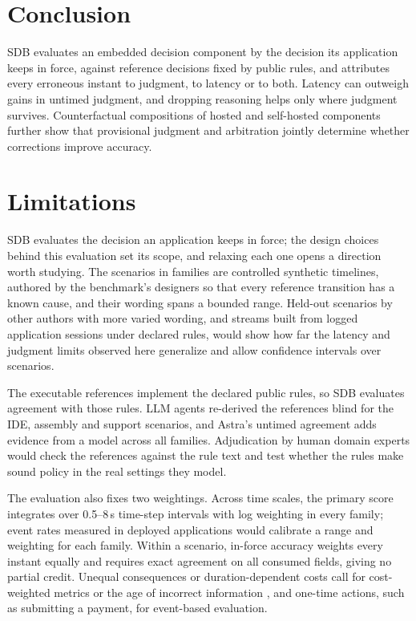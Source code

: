 \documentclass[11pt]{article}
\newcommand{\sdb}{SDB}
\begin{document}
\section{Conclusion}
\label{sec:conclusion}
\sdb{} evaluates an embedded decision component by the decision its application keeps in force, against reference decisions fixed by public rules, and attributes every erroneous instant to judgment, to latency or to both.
Latency can outweigh gains in untimed judgment, and dropping reasoning helps only where judgment survives.
Counterfactual compositions of hosted and self-hosted components further show that provisional judgment and arbitration jointly determine whether corrections improve accuracy.

\section*{Limitations}
\sdb{} evaluates the decision an application keeps in force; the design choices behind this evaluation set its scope, and relaxing each one opens a direction worth studying.
The \NumScenariosWord{} scenarios in \NumFamiliesWord{} families are controlled synthetic timelines, authored by the benchmark's designers so that every reference transition has a known cause, and their wording spans a bounded range.
Held-out scenarios by other authors with more varied wording, and streams built from logged application sessions under declared rules, would show how far the latency and judgment limits observed here generalize and allow confidence intervals over scenarios.

The executable references implement the declared public rules, so \sdb{} evaluates agreement with those rules.
LLM agents re-derived the references blind for the IDE, assembly and support scenarios, and Astra's untimed agreement adds evidence from a model across all \NumFamiliesWord{} families.
Adjudication by human domain experts would check the references against the rule text and test whether the rules make sound policy in the real settings they model.

The evaluation also fixes two weightings.
Across time scales, the primary score integrates over 0.5--8\,s time-step intervals with log weighting in every family; event rates measured in deployed applications would calibrate a range and weighting for each family.
Within a scenario, in-force accuracy weights every instant equally and requires exact agreement on all consumed fields, giving no partial credit. Unequal consequences or duration-dependent costs call for cost-weighted metrics or the age of incorrect information \citep{maatouk2020age}, and one-time actions, such as submitting a payment, for event-based evaluation.
\end{document}

